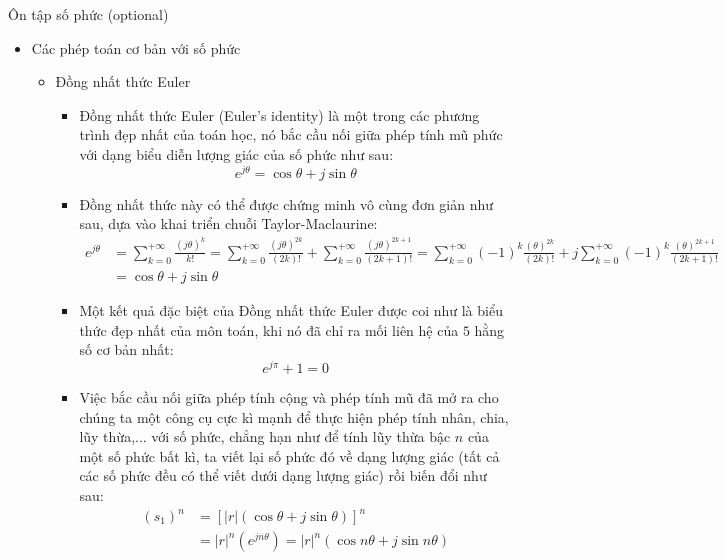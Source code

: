 \documentclass[8pt]{beamer}
\begin{document}
\begin{frame}{Ôn tập số phức (optional)}
	\begin{itemize}
		\item Các phép toán cơ bản với số phức 
			\begin{itemize}
				\item Đồng nhất thức Euler 
					\begin{itemize}
						\item Đồng nhất thức Euler (Euler's identity) là một trong các phương trình đẹp nhất của toán học, nó bắc cầu nối giữa phép tính mũ phức với dạng biểu diễn lượng giác của số phức như sau: $$e^{j\theta}=\cos{\theta}+j\sin{\theta}$$
						\item Đồng nhất thức này có thể được chứng minh vô cùng đơn giản như sau, dựa vào khai triển chuỗi Taylor-Maclaurine:
			\begin{equation*}
	\begin{split}
		e^{j\theta}&=\sum_{k=0}^{+\infty}\frac{(j\theta)^k}{k!}=\sum_{k=0}^{+\infty}\frac{(j\theta)^{2k}}{(2k)!}+\sum_{k=0}^{+\infty}\frac{(j\theta)^{2k+1}}{(2k+1)!}=\sum_{k=0}^{+\infty}(-1)^{k}\frac{(\theta)^{2k}}{(2k)!}+j\sum_{k=0}^{+\infty}(-1)^{k}\frac{(\theta)^{2k+1}}{(2k+1)!} \\
			   &= \cos{\theta}+j\sin{\theta}
	\end{split}
			\end{equation*}
		\item Một kết quả đặc biệt của Đồng nhất thức Euler được coi như là biểu thức đẹp nhất của môn toán, khi nó đã chỉ ra mối liên hệ của $5$ hằng số cơ bản nhất: $$e^{j\pi}+1=0$$
		\item  Việc bắc cầu nối giữa phép tính cộng và phép tính mũ đã mở ra cho chúng ta một công cụ cực kì mạnh để thực hiện phép tính nhân, chia, lũy thừa,... với số phức, chẳng hạn như để tính lũy thừa bậc $n$ của một số phức bất kì, ta viết lại số phức đó về dạng lượng giác (tất cả các số phức đều có thể viết dưới dạng lượng giác) rồi biến đổi như sau:
			\begin{equation*}
			\begin{split}
				(s_{1})^{n}&=[|r|(\cos{\theta}+j\sin{\theta})]^n\\
					   &=|r|^{n}(e^{jn\theta})=|r|^{n}(\cos{n\theta}+j\sin{n\theta})
			\end{split}
		\end{equation*}
					\end{itemize}
			\end{itemize}
	\end{itemize}
\end{frame}
\end{document}
